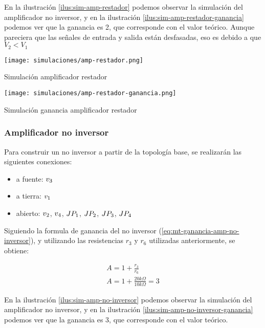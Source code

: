 En la ilustración \ref{ilus:sim-amp-restador} podemos observar la simulación del amplificador no inversor, y en la ilustración \ref{ilus:sim-amp-restador-ganancia} podemos ver que la ganancia es 2, que corresponde con el valor teórico. Aunque pareciera que las señales de entrada y salida están desfasadas, eso es debido a que $V_2 < V_1$

\begin{ilustracion}[ht]
    \centering
    \texttt{[image: simulaciones/amp-restador.png]}
    \caption{Simulación amplificador restador}
    \label{ilus:sim-amp-restador}
\end{ilustracion}

\begin{ilustracion}[ht]
    \centering
    \texttt{[image: simulaciones/amp-restador-ganancia.png]}
    \caption{Simulación ganancia amplificador restador}
    \label{ilus:sim-amp-restador-ganancia}
\end{ilustracion}


\FloatBarrier
\subsubsection{Amplificador no inversor}

Para construir un no inversor a partir de la topología base, se realizarán las siguientes conexiones:

\begin{itemize}
    \item a fuente: $\volt{3}$
    \item a tierra: $\volt{1}$
    \item abierto: $\volt{2}$, $\volt{4}$, $\jumper{1}$, $\jumper{2}$, $\jumper{3}$, $\jumper{4}$
\end{itemize}

Siguiendo la formula de ganancia del no inversor (\ref{eq:mt-ganancia-amp-no-inversor}), y utilizando las resistencias $r_3$ y $r_6$ utilizadas anteriormente, se obtiene:

\begin{align*}
    A = 1 + \frac{r_3}{r_6} \\
    A = 1 + \frac{20k\Omega}{10k\Omega} = 3
\end{align*}

En la ilustración \ref{ilus:sim-amp-no-inversor} podemos observar la simulación del amplificador no inversor, y en la ilustración \ref{ilus:sim-amp-no-inversor-ganancia} podemos ver que la ganancia es 3, que corresponde con el valor teórico.

